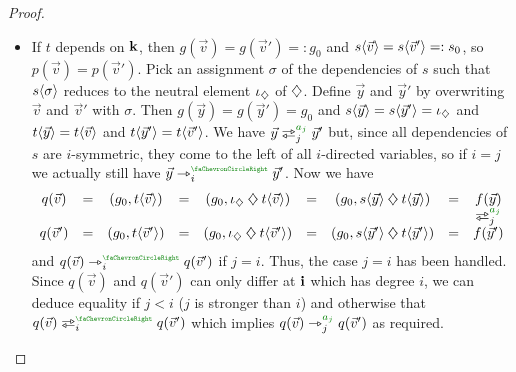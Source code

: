 \documentclass[a4paper]{memoir}
\begin{document}
\begin{proof}
\begin{itemize}
\begin{itemize}
\begin{itemize}
\begin{itemize}
					\item If $t$ depends on $\mathbf{k}$, then $g(\vec v) = g(\vec v') =: g_0$ and $s \langle \vec v \rangle = s \langle \vec v' \rangle =: s_0$, so $p(\vec v) = p(\vec v')$.
					Pick an assignment $\sigma$ of the dependencies of $s$ such that $s \langle \sigma \rangle$ reduces to the neutral element $\iota_{\mathbin{\diamondsuit}}$ of $\mathbin{\diamondsuit}$.
					Define $\vec y$ and $\vec y'$ by overwriting $\vec v$ and $\vec v'$ with $\sigma$.
					Then $g(\vec y) = g(\vec y') = g_0$ and $s \langle \vec y \rangle = s \langle \vec y' \rangle = \iota_{\mathbin{\diamondsuit}}$ and $t \langle \vec y \rangle = t \langle \vec v \rangle$ and $t \langle \vec y' \rangle = t \langle \vec v' \rangle$.
					We have $\vec y \infrajet_j\pmr{a_j} \vec y'$ but, since all dependencies of $s$ are $i$-symmetric, they come to the left of all $i$-directed variables, so if $i = j$ we actually still have $\vec y \jet_i\pmr{\ypolar} \vec y'$.
					Now we have
					\[
						\begin{array}{c c c c c c c c c}
						q(\vec v)
						&=& (g_0, t \psub{\vec v})
						&=& (g_0, \neutralA \opA t \psub{\vec v})
						&=& (g_0, s \psub{\vec y} \opA t \psub{\vec y})
						&=& f(\vec y)
						\\
						&&&&&&&& \infrajet_j\pmr{a_j}
						\\
						q(\vec v')
						&=& (g_0, t \psub{\vec v'})
						&=& (g_0, \neutralA \opA t \psub{\vec v'})
						&=& (g_0, s \psub{\vec y'} \opA t \psub{\vec y'})
						&=& f(\vec y')
						\end{array}
					\]
					and $q(\vec v) \jet_i\pmr{\ypolar} q(\vec v')$ if $j = i$.
					Thus, the case $j = i$ has been handled.
					Since $q(\vec v)$ and $q(\vec v')$ can only differ at $\mathbf{i}$ which has degree $i$, we can deduce equality if $j < i$ ($j$ is stronger than $i$) and otherwise that $q(\vec v) \infrajet_i\pmr{\ypolar} q(\vec v')$ which implies $q(\vec v) \jet_j\pmr{a_j} q(\vec v')$ as required. \qedhere
				\end{itemize}
			\end{itemize}
		\end{itemize}
	\end{itemize}
\end{proof}
\end{document}
